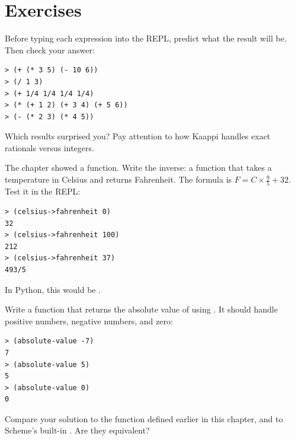 \section*{Exercises}

\begin{exercise}
Before typing each expression into the REPL, predict what the result will be. Then check your answer:

\begin{lstlisting}[style=repl]
> (+ (* 3 5) (- 10 6))
> (/ 1 3)
> (+ 1/4 1/4 1/4 1/4)
> (* (+ 1 2) (+ 3 4) (+ 5 6))
> (- (* 2 3) (* 4 5))
\end{lstlisting}

Which results surprised you? Pay attention to how Kaappi handles exact rationals versus integers.
\end{exercise}

\begin{exercise}
The chapter showed a  function. Write the inverse: a function  that takes a temperature in Celsius and returns Fahrenheit. The formula is $F = C \times \frac{9}{5} + 32$. Test it in the REPL:

\begin{lstlisting}[style=repl]
> (celsius->fahrenheit 0)
32
> (celsius->fahrenheit 100)
212
> (celsius->fahrenheit 37)
493/5
\end{lstlisting}

In Python, this would be .
\end{exercise}

\begin{exercise}
Write a function  that returns the absolute value of  using . It should handle positive numbers, negative numbers, and zero:

\begin{lstlisting}[style=repl]
> (absolute-value -7)
7
> (absolute-value 5)
5
> (absolute-value 0)
0
\end{lstlisting}

Compare your solution to the  function defined earlier in this chapter, and to Scheme's built-in . Are they equivalent?
\end{exercise}


